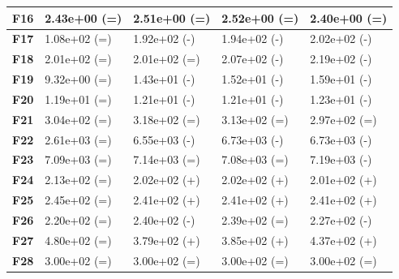 \documentclass[12pt,a4paper]{report}
\begin{document}
{{{{{{\begin{table}[]
\begin{tabular}{|l|l|l|l|l|}
{\bf F16} & 2.43e+00 (=)        & 2.51e+00 (=)    & 2.52e+00 (=)     & 2.40e+00 (=)     \\ \hline
{\bf F17} & 1.08e+02 (=)        & 1.92e+02 (-)    & 1.94e+02 (-)     & 2.02e+02 (-)     \\ \hline
{\bf F18} & 2.01e+02 (=)        & 2.01e+02 (=)    & 2.07e+02 (-)     & 2.19e+02 (-)     \\ \hline
{\bf F19} & 9.32e+00 (=)        & 1.43e+01 (-)    & 1.52e+01 (-)     & 1.59e+01 (-)     \\ \hline
{\bf F20} & 1.19e+01 (=)        & 1.21e+01 (-)    & 1.21e+01 (-)     & 1.23e+01 (-)     \\ \hline
{\bf F21} & 3.04e+02 (=)        & 3.18e+02 (=)    & 3.13e+02 (=)     & 2.97e+02 (=)     \\ \hline
{\bf F22} & 2.61e+03 (=)        & 6.55e+03 (-)    & 6.73e+03 (-)     & 6.73e+03 (-)     \\ \hline
{\bf F23} & 7.09e+03 (=)        & 7.14e+03 (=)    & 7.08e+03 (=)     & 7.19e+03 (-)     \\ \hline
{\bf F24} & 2.13e+02 (=)        & 2.02e+02 (+)    & 2.02e+02 (+)     & 2.01e+02 (+)     \\ \hline
{\bf F25} & 2.45e+02 (=)        & 2.41e+02 (+)    & 2.41e+02 (+)     & 2.41e+02 (+)     \\ \hline
{\bf F26} & 2.20e+02 (=)        & 2.40e+02 (-)    & 2.39e+02 (=)     & 2.27e+02 (-)     \\ \hline
{\bf F27} & 4.80e+02 (=)        & 3.79e+02 (+)    & 3.85e+02 (+)     & 4.37e+02 (+)     \\ \hline
{\bf F28} & 3.00e+02 (=)        & 3.00e+02 (=)    & 3.00e+02 (=)     & 3.00e+02 (=)     \\ \hline
\end{tabular}
\end{table}

}}}}}}
\end{document}
